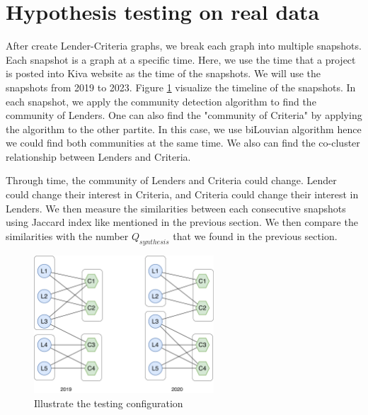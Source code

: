 \section{Hypothesis testing on real data}

After create Lender-Criteria graphs, we break each graph into multiple snapshots.
Each snapshot is a graph at a specific time.
Here, we use the time that a project is posted into Kiva website as the time of the snapshots.
We will use the snapshots from 2019 to 2023.
Figure \ref{fig:testing_method} visualize the timeline of the snapshots.
In each snapshot, we apply the community detection algorithm to find the community of Lenders.
One can also find the "community of Criteria" by applying the algorithm to the other partite.
In this case, we use biLouvian algorithm hence we could find both communities at the same time.
We also can find the co-cluster relationship between Lenders and Criteria.

Through time, the community of Lenders and Criteria could change.
Lender could change their interest in Criteria,
and Criteria could change their interest in Lenders.
We then measure the similarities between each consecutive snapshots
using Jaccard index like mentioned in the previous section.
We then compare the similarities with the number $Q_{synthesis}$ that we found in the previous section.

\begin{figure}[H]
	\centering
	\includegraphics[width=0.6\textwidth]{images/testing_method.pdf}
	\caption{Illustrate the testing configuration}
	\label{fig:testing_method}
\end{figure}

